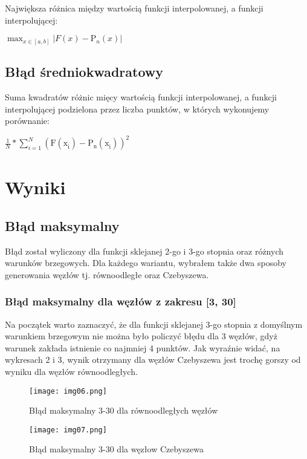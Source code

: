 \documentclass{article}
\begin{document}
Największa różnica między wartością funkcji interpolowanej, a funkcji interpolującej:

\begin{center}
    \(\max_{x\in [a, b]} |F(x) - \mathrm{P}_{n}^{}(x)|\)
\end{center}

\subsection{Błąd średniokwadratowy}

Suma kwadratów różnic mięcy wartością funkcji interpolowanej, a funkcji interpolującej podzielona przez liczba punktów, w których wykonujemy porównanie:

\begin{center}
\(\frac{1}{N} * \sum_{i = 1}^{N}\mathrm{(F(\mathrm{x}_{i}^{}) - \mathrm{P}_{n}^{}(\mathrm{x}_{i}^{}))}_{}^{2}\)
\end{center}

\section{Wyniki}

\subsection{Błąd maksymalny}

Błąd został wyliczony dla funkcji sklejanej 2-go i 3-go stopnia oraz różnych warunków brzegowych. Dla każdego wariantu, wybrałem także dwa sposoby generowania węzłów tj. równoodległe oraz Czebyszewa.

\subsubsection{Błąd maksymalny dla węzłów z zakresu [3, 30]}


Na początek warto zaznaczyć, że dla funkcji sklejanej 3-go stopnia z domyślnym warunkiem brzegowym 
nie można było policzyć błędu dla 3 węzłów, gdyż warunek zakłada istnienie co najmniej 4 punktów.
\bigbreak
\noindent
Jak wyraźnie widać, na wykresach 2 i 3, wynik otrzymany dla węzłów Czebyszewa jest trochę gorszy od wyniku dla węzłów równoodległych.

\begin{figure}[H]
  \begin{minipage}[b]{0.49\textwidth}
    \texttt{[image: img06.png]}
    \caption{Błąd maksymalny 3-30 dla równoodległych węzłów}
  \end{minipage}
  \hfill
  \begin{minipage}[b]{0.49\textwidth}
    \texttt{[image: img07.png]}
    \caption{Błąd maksymalny 3-30 dla węzłow Czebyszewa}
  \end{minipage}
\end{figure}
\end{document}
